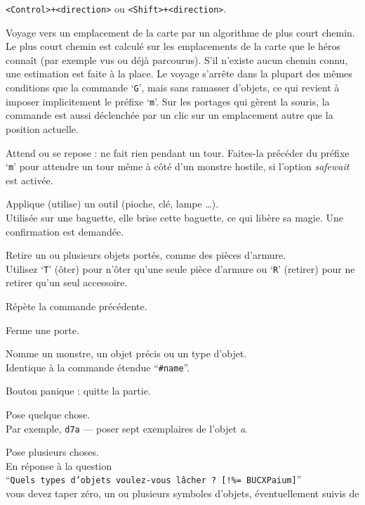 \documentclass[titlepage]{article}
\begin{document}
\begin{description}[font=\mdseries\ttfamily]
\texttt{<Control>+<direction>} ou \texttt{<Shift>+<direction>}.
\item[\textunderscore]
Voyage vers un emplacement de la carte par un algorithme de plus court chemin.\\
Le plus court chemin
est calculé sur les emplacements de la carte que le héros connaît (par exemple
vus ou déjà parcourus).
S'il n'existe aucun chemin connu, une estimation est faite à la place.
Le voyage s'arrête dans la plupart
des mêmes conditions que la commande `\texttt{G}', mais sans ramasser
d'objets, ce qui revient à imposer implicitement le préfixe `\texttt{m}'.
Sur les portages qui gèrent
la souris, la commande est aussi déclenchée par un clic sur un
emplacement autre que la position actuelle.
\item[.]
Attend ou se repose : ne fait rien pendant un tour.
Faites-la précéder du préfixe `\texttt{m}'
pour attendre un tour même à côté d'un monstre hostile, si l'option \textit{safe\textunderscore wait}
est activée.
\item[a]
Applique (utilise) un outil (pioche, clé, lampe \ldots).\\
Utilisée sur une baguette, elle brise cette baguette, ce qui libère sa
magie.
Une confirmation est demandée.
\item[A]
Retire un ou plusieurs objets portés, comme des pièces d'armure.\\
Utilisez `\texttt{T}' (ôter) pour n'ôter qu'une seule pièce d'armure
ou `\texttt{R}' (retirer) pour ne retirer qu'un seul accessoire.
\item[\textasciicircum A]
Répète la commande précédente.
\item[c]
Ferme une porte.
\item[C]
Nomme un monstre, un objet précis ou un type d'objet.\\
Identique à la commande étendue ``\texttt{\#name}''.
\item[\textasciicircum C]
Bouton panique : quitte la partie.
\item[d]
Pose quelque chose.\\
Par exemple, \texttt{d7a} --- poser sept exemplaires de l'objet
\textit{a}.
\item[D]
Pose plusieurs choses.\\
En réponse à la question\\
``\texttt{Quels types d'objets voulez-vous lâcher ? [!\%= BUCXPaium]}''\\
vous devez taper zéro, un ou plusieurs symboles d'objets, éventuellement suivis de

\end{description}
\end{document}
